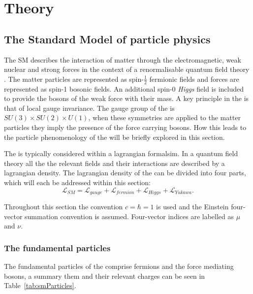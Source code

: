 \chapter{Theory}
\label{chap:theory}


\section{The Standard Model of particle physics}
\label{sec:sm}

The \acf{SM} describes the interaction of matter through the
electromagnetic, weak nuclear and strong forces in the context of a
renormalisable quantum field theory
\cite{Salam:1964ry,Glashow:1961tr,PhysRevLett.19.1264}. The matter
particles are represented as spin-$\frac{1}{2}$ fermionic fields and
forces are represented as spin-1 bosonic fields. An additional spin-0
\emph{Higgs} field is included to provide the bosons of the weak force
with their mass. A key principle in the \SM is that of local gauge
invariance. The gauge group of the \SM is $SU(3)\times SU(2) \times
U(1)$, when these symmetries are applied to the matter particles they
imply the presence of the force carrying bosons. How this leads to the
particle phenomenology of the \SM will be briefly explored in this
section.

The \SM is typically considered within a lagrangian formalsim. In a
quantum field theory all the the relevant fields and their
interactions are described by a lagrangian density. The lagrangian
density of the \SM can be divided into four parts, which will each be
addressed within this section:
\begin{equation}
\mathcal{L}_{SM}=\mathcal{L}_{gauge}+\mathcal{L}_{fermion}+\mathcal{L}_{Higgs}+\mathcal{L}_{Yukawa}.
\end{equation}

Throughout this section the convention $c=\hbar = 1$ is used and the
Einstein four-vector summation convention is assumed. Four-vector indices
are labelled as $\mu$ and $\nu$.

\subsection{The fundamental particles}

The fundamental particles of the \SM comprise
fermions and the force mediating bosons, a summary them and their
relevant charges can be seen in Table~\ref{tab:smParticles}. 

